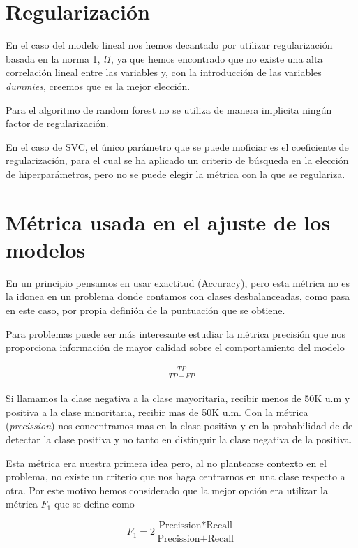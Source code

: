 \documentclass[11pt]{article}
\begin{document}
\section{Regularización}

En el caso del modelo lineal nos hemos decantado por utilizar regularización
basada en la norma 1, \textit{l1}, ya que hemos encontrado que no existe una
alta correlación lineal entre las variables y, con la introducción de las
variables \textit{dummies}, creemos que es la mejor elección. 

Para el algoritmo de random forest no se utiliza de manera implicita ningún
factor de regularización.

En el caso de SVC, el único parámetro que se puede moficiar es el coeficiente de
regularización, para el cual se ha aplicado un criterio de búsqueda en la
elección de hiperparámetros, pero no se puede elegir la métrica con la que se
regulariza.


\section{Métrica usada en el ajuste de los modelos}

En un principio pensamos en usar exactitud (Accuracy), pero esta métrica no es
la idonea en un problema donde contamos con clases desbalanceadas, como pasa en
este caso, por propia definión de la puntuación que se obtiene. 

Para problemas puede ser más interesante estudiar la métrica precisión que nos
proporciona información de mayor calidad sobre el comportamiento del modelo 

\begin{align*}
\frac{TP}{TP+FP}
\end{align*}

Si llamamos la clase negativa a la clase mayoritaria, recibir menos de 50K u.m y
positiva a la clase minoritaria, recibir mas de 50K u.m. Con la métrica
(\textit{precission}) \cite{metrics} nos concentramos mas en la clase positiva y
en la probabilidad de de detectar la clase positiva y no tanto en distinguir la
clase negativa de la positiva.

Esta métrica era nuestra primera idea pero, al no plantearse contexto en el problema,
no existe un criterio que nos haga centrarnos en una clase respecto a otra. Por este 
motivo hemos considerado que la mejor opción era utilizar la métrica $F_1$ 
que se define como 

\[
    F_1 = 2\frac{\text{Precission} * \text{Recall}}{\text{Precission} + \text{Recall}} 
\]
\end{document}
